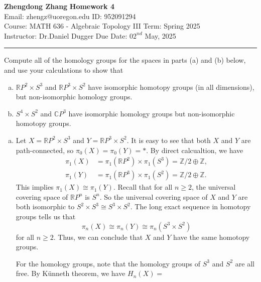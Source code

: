\documentclass[a4paper, 12pt]{article}
\begin{document}
\noindent

\large\textbf{Zhengdong Zhang} \hfill \textbf{Homework 4} \\
Email: zhengz@uoregon.edu \hfill ID: 952091294 \\
\normalsize Course: MATH 636 - Algebraic Topology III \hfill Term: Spring 2025 \\
Instructor: Dr.Daniel Dugger \hfill Due Date: $02^{nd}$ May, 2025 \\ 
\noindent\rule{7in}{2.8pt}

\begin{problem}{1}
Compute all of the homology groups for the spaces in parts (a) and (b) below, and use your calculations to show that 
\begin{enumerate}[(a)]
\item \(\mathbb{R}P^2\times S^3\) and \(\mathbb{R}P^3\times S^2\) have isomorphic homotopy groups (in all dimensions), but non-isomorphic homology groups. 
\item \(S^4\times S^2\) and \(\mathbb{C}P^3\) have isomorphic homology groups but non-isomorphic homotopy groups. 
\end{enumerate}
\end{problem}
\begin{solution}
\begin{enumerate}[(a)]
\item Let \(X=\mathbb{R}P^2\times S^3\) and \(Y=\mathbb{R}P^3\times S^2\). It is easy to see that both \(X\) and \(Y\) are path-connected, so \(\pi_0(X)=\pi_0(Y)=*\). By direct calcualtion, we have 
\begin{align*}
	\pi_1(X)&=\pi_1(\mathbb{R}P^2)\times \pi_1(S^3)=\mathbb{Z}/2\oplus \mathbb{Z},\\ 
	\pi_1(Y)&=\pi_1(\mathbb{R}P^3)\times \pi_1(S^2)=\mathbb{Z}/2\oplus \mathbb{Z}.
\end{align*}
This implies \(\pi_1(X)\cong \pi_1(Y)\). Recall that for all \(n\geq 2\), the universal covering space of \(\mathbb{R}P^n\) is \(S^n\). So the universal covering space of \(X\) and \(Y\) are both isomorphic to 
\(S^2\times S^3\cong S^3\times S^2\). The long exact sequence in homotopy groups tells us that 
\[\pi_n(X)\cong \pi_n(Y)\cong \pi_n(S^3\times S^2)\]
for all \(n\geq 2\). Thus, we can conclude that \(X\) and \(Y\) have the same homotopy groups. 

For the homology groups, note that the homology groups of \(S^3\) and \(S^2\) are all free. By Künneth theorem, we have 
\(H_n(X)=\)
\end{enumerate}
\end{solution}
\end{document}
